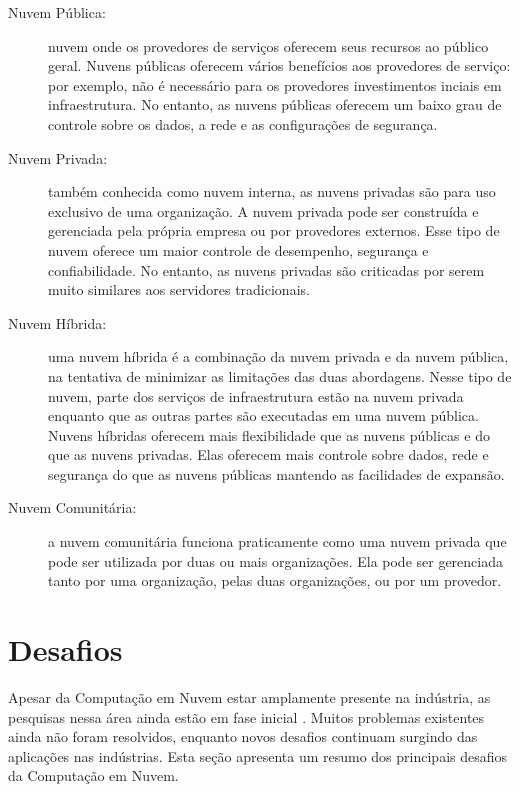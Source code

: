	\begin{description}
	
		\item[Nuvem Pública:] nuvem onde os provedores de serviços oferecem seus recursos ao público geral. Nuvens públicas oferecem vários benefícios aos provedores de serviço: por exemplo, não é necessário para os provedores investimentos inciais em infraestrutura. No entanto, as nuvens públicas oferecem um baixo grau de controle sobre os dados, a rede e as configurações de segurança.  	 
			
		\item[Nuvem Privada:] também conhecida como nuvem interna, as nuvens privadas são para uso exclusivo de uma organização. A nuvem privada pode ser construída e gerenciada pela própria empresa ou por provedores externos. Esse tipo de nuvem oferece um maior controle de desempenho, segurança e confiabilidade. No entanto, as nuvens privadas são criticadas por serem muito similares aos servidores tradicionais.
		
		\item[Nuvem Híbrida:] uma nuvem híbrida é a combinação da nuvem privada e da nuvem pública, na tentativa de minimizar as limitações das duas abordagens. Nesse tipo de nuvem, parte dos serviços de infraestrutura estão na nuvem privada enquanto que as outras partes são executadas em uma nuvem pública. Nuvens híbridas oferecem mais flexibilidade que as nuvens públicas e do que as nuvens privadas. Elas oferecem mais controle sobre dados, rede e segurança do que as nuvens públicas mantendo as facilidades de expansão.
		
		\item[Nuvem Comunitária:] a nuvem comunitária funciona praticamente como uma nuvem privada que pode ser utilizada por duas ou mais organizações. Ela pode ser gerenciada tanto por uma organização, pelas duas organizações, ou por um provedor.
		 	
	\end{description}
	
\section{Desafios} \label{cloud:chal}

	Apesar da Computação em Nuvem estar amplamente presente na indústria, as pesquisas nessa área ainda estão em fase inicial \cite{stateOfArt:2010}.  Muitos problemas existentes ainda não foram resolvidos, enquanto novos desafios continuam surgindo das aplicações nas indústrias. Esta seção apresenta um resumo dos principais desafios da Computação em Nuvem. 
	
